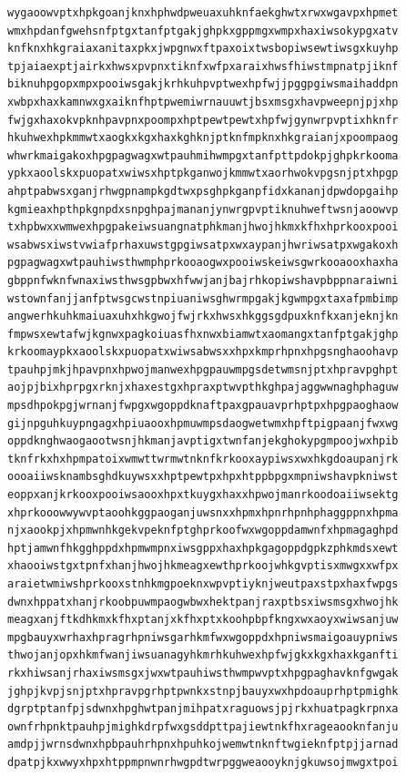 \documentclass[11pt,letterpaper]{exam}
\begin{document}
\begin{questions}
\begin{verbatim}
wygaoowvptxhpkgoanjknxhphwdpweuaxuhknfaekghwtxrwxwgavpxhpmet
wmxhpdanfgwehsnfptgxtanfptgakjghpkxgppmgxwmpxhaxiwsokypgxatv
knfknxhkgraiaxanitaxpkxjwpgnwxftpaxoixtwsbopiwsewtiwsgxkuyhp
tpjaiaexptjairkxhwsxpvpnxtiknfxwfpxaraixhwsfhiwstmpnatpjiknf
biknuhpgopxmpxpooiwsgakjkrhkuhpvptwexhpfwjjpggpgiwsmaihaddpn
xwbpxhaxkamnwxgxaiknfhptpwemiwrnauuwtjbsxmsgxhavpweepnjpjxhp
fwjgxhaxokvpknhpavpnxpoompxhptpewtpewtxhpfwjgynwrpvptixhknfr
hkuhwexhpkmmwtxaogkxkgxhaxkghknjptknfmpknxhkgraianjxpoompaog
whwrkmaigakoxhpgpagwagxwtpauhmihwmpgxtanfpttpdokpjghpkrkooma
ypkxaoolskxpuopatxwiwsxhptpkganwojkmmwtxaorhwokvpgsnjptxhpgp
ahptpabwsxganjrhwgpnampkgdtwxpsghpkganpfidxkananjdpwdopgaihp
kgmieaxhpthpkgnpdxsnpghpajmananjynwrgpvptiknuhweftwsnjaoowvp
txhpbwxxwmwexhpgpakeiwsuangnatphkmanjhwojhkmxkfhxhprkooxpooi
wsabwsxiwstvwiafprhaxuwstgpgiwsatpxwxaypanjhwriwsatpxwgakoxh
pgpagwagxwtpauhiwsthwmphprkooaogwxpooiwskeiwsgwrkooaooxhaxha
gbppnfwknfwnaxiwsthwsgpbwxhfwwjanjbajrhkopiwshavpbppnaraiwni
wstownfanjjanfptwsgcwstnpiuaniwsghwrmpgakjkgwmpgxtaxafpmbimp
angwerhkuhkmaiuaxuhxhkgwojfwjrkxhwsxhkggsgdpuxknfkxanjeknjkn
fmpwsxewtafwjkgnwxpagkoiuasfhxnwxbiamwtxaomangxtanfptgakjghp
krkoomaypkxaoolskxpuopatxwiwsabwsxxhpxkmprhpnxhpgsnghaoohavp
tpauhpjmkjhpavpnxhpwojmanwexhpgpauwmpgsdetwmsnjptxhpravpghpt
aojpjbixhprpgxrknjxhaxestgxhpraxptwvpthkghpajaggwwnaghphaguw
mpsdhpokpgjwrnanjfwpgxwgoppdknaftpaxgpauavprhptpxhpgpaoghaow
gijnpguhkuypngagxhpiuaooxhpmuwmpsdaogwetwmxhpftpigpaanjfwxwg
oppdknghwaogaootwsnjhkmanjavptigxtwnfanjekghokypgmpoojwxhpib
tknfrkxhxhpmpatoixwmwttwrmwtnknfkrkooxaypiwsxwxhkgdoaupanjrk
oooaiiwsknambsghdkuywsxxhptpewtpxhpxhtppbpgxmpniwshavpkniwst
eoppxanjkrkooxpooiwsaooxhpxtkuygxhaxxhpwojmanrkoodoaiiwsektg
xhprkooowwywvptaoohkggpaoganjuwsnxxhpmxhpnrhpnhphaggppnxhpma
njxaookpjxhpmwnhkgekvpeknfptghprkoofwxwgoppdamwnfxhpmagaghpd
hptjamwnfhkgghppdxhpmwmpnxiwsgppxhaxhpkgagoppdgpkzphkmdsxewt
xhaooiwstgxtpnfxhanjhwojhkmeagxewthprkoojwhkgvptisxmwgxxwfpx
araietwmiwshprkooxstnhkmgpoeknxwpvptiyknjweutpaxstpxhaxfwpgs
dwnxhppatxhanjrkoobpuwmpaogwbwxhektpanjraxptbsxiwsmsgxhwojhk
meagxanjftkdhkmxkfhxptanjxkfhxptxkoohpbpfkngxwxaoyxwiwsanjuw
mpgbauyxwrhaxhpragrhpniwsgarhkmfwxwgoppdxhpniwsmaigoauypniws
thwojanjopxhkmfwanjiwsuanagyhkmrhkuhwexhpfwjgkxkgxhaxkganfti
rkxhiwsanjrhaxiwsmsgxjwxwtpauhiwsthwmpwvptxhpgpaghavknfgwgak
jghpjkvpjsnjptxhpravpgrhptpwnkxstnpjbauyxwxhpdoauprhptpmighk
dgrptptanfpjsdwnxhpghwtpanjmihpatxraguowsjpjrkxhuatpagkrpnxa
ownfrhpnktpauhpjmighkdrpfwxgsddpttpajiewtnkfhxrageaooknfanju
amdpjjwrnsdwnxhpbpauhrhpnxhpuhkojwemwtnknftwgieknfptpjjarnad
dpatpjkxwwyxhpxhtppmpnwnrhwgpdtwrpggweaooyknjgkuwsojmwgxtpoi

\end{verbatim}
\end{questions}
\end{document}
